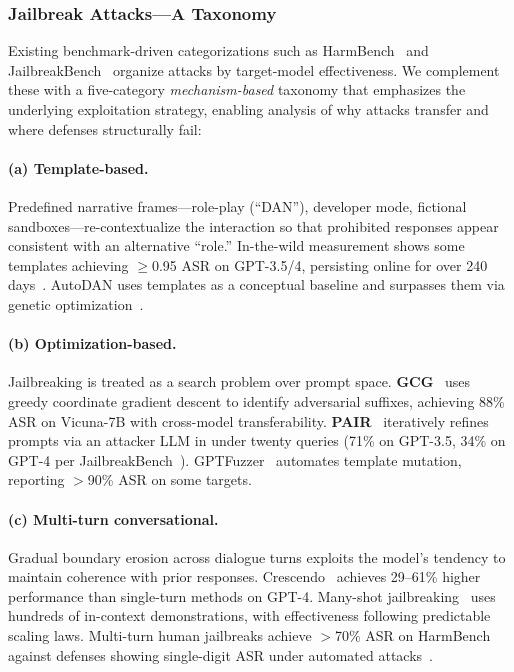 \subsubsection{Jailbreak Attacks---A Taxonomy}
\label{sec:threat-jailbreak}

Existing benchmark-driven categorizations such as HarmBench~\cite{mazeika2024harmbench} and JailbreakBench~\cite{chao2024jailbreakbench} organize attacks by target-model effectiveness. We complement these with a five-category \emph{mechanism-based} taxonomy that emphasizes the underlying exploitation strategy, enabling analysis of why attacks transfer and where defenses structurally fail:

\paragraph{(a) Template-based.}
Predefined narrative frames---role-play (``DAN''), developer mode, fictional sandboxes---re-contextualize the interaction so that prohibited responses appear consistent with an alternative ``role.'' In-the-wild measurement shows some templates achieving $\geq$0.95 ASR on GPT-3.5/4, persisting online for over 240 days~\cite{zhang2024dananything}. AutoDAN uses templates as a conceptual baseline and surpasses them via genetic optimization~\cite{liu2024autodan}.

\paragraph{(b) Optimization-based.}
Jailbreaking is treated as a search problem over prompt space. \textbf{GCG}~\cite{zou2023gcg} uses greedy coordinate gradient descent to identify adversarial suffixes, achieving 88\% ASR on Vicuna-7B with cross-model transferability. \textbf{PAIR}~\cite{chao2024pair} iteratively refines prompts via an attacker LLM in under twenty queries (71\% on GPT-3.5, 34\% on GPT-4 per JailbreakBench~\cite{chao2024jailbreakbench}). GPTFuzzer~\cite{yu2023gptfuzzer} automates template mutation, reporting $>$90\% ASR on some targets.

\paragraph{(c) Multi-turn conversational.}
Gradual boundary erosion across dialogue turns exploits the model's tendency to maintain coherence with prior responses. Crescendo~\cite{russinovich2025crescendo} achieves 29--61\% higher performance than single-turn methods on GPT-4. Many-shot jailbreaking~\cite{anil2024manyshot} uses hundreds of in-context demonstrations, with effectiveness following predictable scaling laws. Multi-turn human jailbreaks achieve $>$70\% ASR on HarmBench against defenses showing single-digit ASR under automated attacks~\cite{mazeika2024harmbench}.

